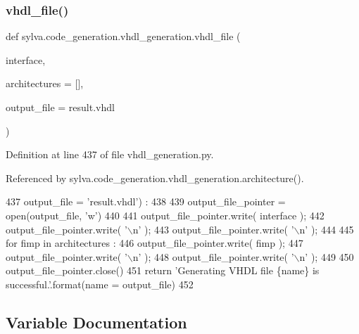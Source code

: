 \subsubsection{\texorpdfstring{vhdl\+\_\+file()}{vhdl\_file()}}
{\footnotesize\ttfamily def sylva.\+code\+\_\+generation.\+vhdl\+\_\+generation.\+vhdl\+\_\+file (\begin{DoxyParamCaption}\item[{}]{interface,  }\item[{}]{architectures = {\ttfamily \mbox{[}\mbox{]}},  }\item[{}]{output\+\_\+file = {\ttfamily \textquotesingle{}result.vhdl\textquotesingle{}} }\end{DoxyParamCaption})}



Definition at line 437 of file vhdl\+\_\+generation.\+py.



Referenced by sylva.\+code\+\_\+generation.\+vhdl\+\_\+generation.\+architecture().


\begin{DoxyCode}
437   output\_file = \textcolor{stringliteral}{'result.vhdl'}) :
438 
439   output\_file\_pointer = open(output\_file, \textcolor{stringliteral}{'w'})
440 
441   output\_file\_pointer.write( interface );
442   output\_file\_pointer.write( \textcolor{stringliteral}{'\(\backslash\)n'} );
443   output\_file\_pointer.write( \textcolor{stringliteral}{'\(\backslash\)n'} );
444 
445   \textcolor{keywordflow}{for} fimp \textcolor{keywordflow}{in} architectures :
446     output\_file\_pointer.write( fimp );
447     output\_file\_pointer.write( \textcolor{stringliteral}{'\(\backslash\)n'} );
448     output\_file\_pointer.write( \textcolor{stringliteral}{'\(\backslash\)n'} );
449 
450   output\_file\_pointer.close()
451   \textcolor{keywordflow}{return} \textcolor{stringliteral}{'Generating VHDL file \{name\} is successful.'}.format(name = output\_file)
452 \end{DoxyCode}


\subsection{Variable Documentation}
\mbox{\label{namespacesylva_1_1code__generation_1_1vhdl__generation_a0cf71880063e2c29029ca74b630eec28}} 
